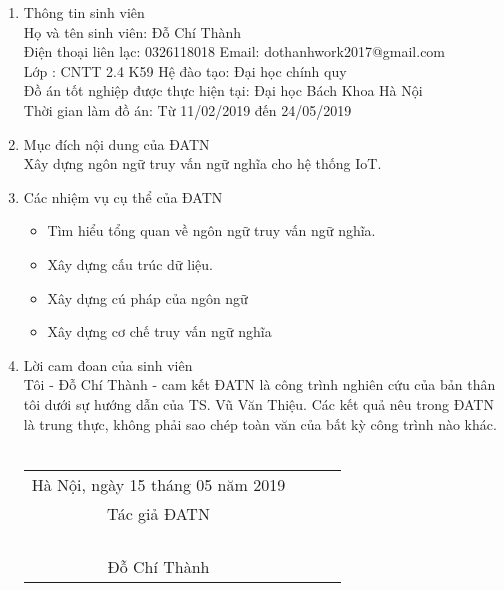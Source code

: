 \cleardoublepage

\begin{dedication}
  \begin{enumerate}
  	\item Thông tin sinh viên \\
  		Họ và tên sinh viên: Đỗ Chí Thành \\
		Điện thoại liên lạc: 0326118018        Email: dothanhwork2017@gmail.com\\
		Lớp : CNTT 2.4 K59            Hệ đào tạo: Đại học chính quy\\
		Đồ án tốt nghiệp được thực hiện tại: Đại học Bách Khoa Hà Nội\\
		Thời gian làm đồ án: Từ 11/02/2019 đến 24/05/2019
	\item Mục đích nội dung của ĐATN \\
		Xây dựng ngôn ngữ truy vấn ngữ nghĩa cho hệ thống IoT.
	\item Các nhiệm vụ cụ thể của ĐATN
		\begin{itemize}
			\item Tìm hiểu tổng quan về ngôn ngữ truy vấn ngữ nghĩa.
			\item Xây dựng cấu trúc dữ liệu.
			\item Xây dựng cú pháp của ngôn ngữ
			\item Xây dựng cơ chế truy vấn ngữ nghĩa
		\end{itemize}
	\item Lời cam đoan của sinh viên \\
		Tôi - Đỗ Chí Thành - cam kết ĐATN là công trình nghiên cứu của bản thân tôi dưới sự hướng dẫn của TS. Vũ Văn Thiệu. Các kết quả nêu trong ĐATN là trung thực, không phải sao chép toàn văn của bất kỳ công trình nào khác. \\
		\\
	  	\begin{tabu} {c c c c}
  	
  		 	\hspace{60mm} Hà Nội, ngày 15 tháng 05 năm 2019\\
  			\hspace{70mm} Tác giả ĐATN\\
  			\\
  			\\
  			\\
  			\\
  			\hspace{70mm} Đỗ Chí Thành\\
  	
  	
  		\end{tabu}
  

\end{enumerate}
\end{dedication}
